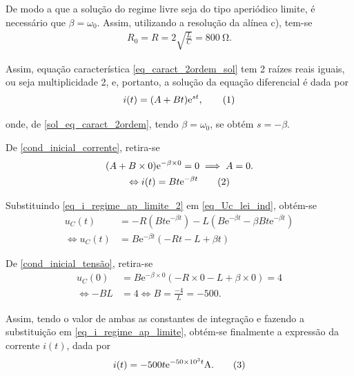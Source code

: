 \documentclass[a4paper, titlepage, portuguese]{article}
\newcommand{\eq}{\Leftrightarrow} %
\newcommand\numberthis{\addtocounter{equation}{1}\tag{\theequation}}
\newcommand\e{\mathrm{e} }
\begin{document}
	\subsubsection{}
	
		\par
		De modo a que a solução do regime livre seja do tipo aperiódico limite, é necessário que $\beta = \omega_{0}$. Assim, utilizando a resolução da alínea c), tem-se 
		\begin{align*}
			 R_0 = R = 2\sqrt{\frac{L}{C}} = \SI{800}{\ohm}.
		\end{align*}
		
		Assim, equação característica \eqref{eq_caract_2ordem_sol} tem 2 raízes reais iguais, ou seja multiplicidade 2, e, portanto, a solução da equação diferencial é dada por
		\begin{align*}
			i ( t ) = ( A + B t ) \e ^ { s t }, \numberthis \label{eq_i_regime_ap_limite}
		\end{align*}

		onde, de \eqref{sol_eq_caract_2ordem}, tendo $\beta = \omega_{0}$, se obtém $s = - \beta$.
		
		De \eqref{cond_inicial_corrente}, retira-se 
		\begin{gather*}
			( A + B \times 0 ) \e ^ { - \beta \times 0 } = 0 \implies A = 0. \\ \eq
			i(t) = Bt\e^{-\beta t} \numberthis \label{eq_i_regime_ap_limite_2}
		\end{gather*}
		
		Substituindo \eqref{eq_i_regime_ap_limite_2} em \eqref{eq_Uc_lei_ind}, obtém-se
		\begin{align*}
			 u_C(t) &= -R\left(Bt\e^{-\beta t}\right) - L\left( B\e^{-\beta t} -\beta Bt\e^{-\beta t} \right) \\ \eq
			u_C(t)  &= B\e^{-\beta t} \left(  -Rt - L +\beta t  \right)
		\end{align*}
		
		De \eqref{cond_inicial_tensão}, retira-se 
		\begin{align*}
			 u_C(0)  &= B\e^{-\beta \times 0} \left(  -R\times 0 - L +\beta \times 0  \right) = 4 \\ \eq 
			 -BL &= 4 \eq B = \frac{-4}{L} = -500.
		\end{align*}
		
		Assim, tendo o valor de ambas as constantes de integração e fazendo a substituição em \eqref{eq_i_regime_ap_limite}, obtém-se finalmente a expressão da corrente $i(t)$, dada por 
		\begin{align*}
			i(t) = -500t\e^{-\num{50e3}t} \si{\ampere}. \numberthis \label{eq_i(t)_final}
		\end{align*}
		
\end{document}
